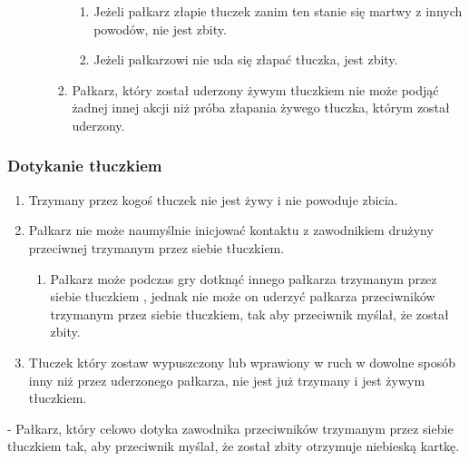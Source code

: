 \documentclass[12pt]{article}
\newcommand\bluecard{\bgroup\color{blue}\markoverwith{\textcolor{blue}{\rule[-0.5ex]{2pt}{0.4pt}}}\ULon}
\begin{document}
\begin{enumerate}
\begin{enumerate}
\begin{enumerate}
			                  \begin{enumerate}
				                  \item
				                        Jeżeli pałkarz złapie tłuczek zanim ten stanie się martwy z
				                        innych powodów, nie jest zbity.
				                  \item
				                        Jeżeli pałkarzowi nie uda się złapać tłuczka, jest zbity.
			                  \end{enumerate}
			            \item
			                  Pałkarz, który został uderzony żywym tłuczkiem nie może podjąć
			                  żadnej innej akcji niż próba złapania żywego tłuczka, którym
			                  został uderzony.
		            \end{enumerate}
	      \end{enumerate}
\end{enumerate}

\subsubsection{Dotykanie tłuczkiem}

\begin{enumerate}
	\item
	      Trzymany przez kogoś tłuczek nie jest żywy i nie powoduje zbicia.
	\item
	      Pałkarz nie może naumyślnie inicjować kontaktu z zawodnikiem drużyny
	      przeciwnej trzymanym przez siebie tłuczkiem.

	      \begin{enumerate}
		      \item
		            Pałkarz może podczas gry dotknąć innego pałkarza trzymanym przez
		            siebie tłuczkiem , jednak nie może on uderzyć pałkarza przeciwników
		            trzymanym przez siebie tłuczkiem, tak aby przeciwnik myślał, że
		            został zbity.
	      \end{enumerate}
	\item
	      Tłuczek który zostaw wypuszczony lub wprawiony w ruch w dowolne sposób
	      inny niż przez uderzonego pałkarza, nie jest już trzymany i jest żywym
	      tłuczkiem.
\end{enumerate}

\bluecard{Niebieska kartka} - Pałkarz, który celowo dotyka zawodnika
przeciwników trzymanym przez siebie tłuczkiem tak, aby przeciwnik
myślał, że został zbity otrzymuje niebieską kartkę.
\end{document}
